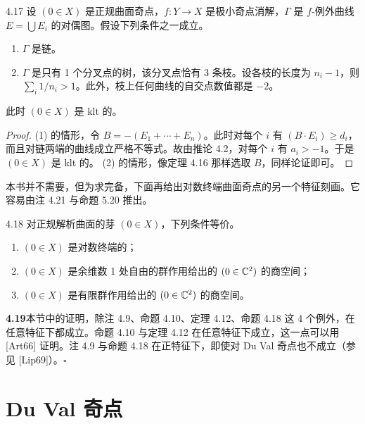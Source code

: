 \begin{theoremp}{4.17}
设 $(0\in X)$ 是正规曲面奇点，$f\colon Y\to X$ 是极小奇点消解，$\Gamma$ 是 $f$-例外曲线 $E=\bigcup E_i$ 的对偶图。假设下列条件之一成立。
\begin{enumerate}[label=(\arabic*),leftmargin=*]
\item $\Gamma$ 是链。
\item $\Gamma$ 是只有 1 个分叉点的树，该分叉点恰有 3 条枝。设各枝的长度为 $n_i-1$，则 $\sum_i1/n_i>1$。此外，枝上任何曲线的自交点数值都是 $-2$。
\end{enumerate}
此时 $(0\in X)$ 是 klt 的。
\end{theoremp}

\begin{proof}
(1) 的情形，令 $B=-(E_1+\cdots+E_n)$。此时对每个 $i$ 有 $(B\cdot E_i)\ge d_i$，而且对链两端的曲线成立严格不等式。故由推论 4.2，对每个 $i$ 有 $a_i>-1$。于是 $(0\in X)$ 是 klt 的。
(2) 的情形，像定理 4.16 那样选取 $B$，同样论证即可。
\end{proof}

本书并不需要，但为求完备，下面再给出对数终端曲面奇点的另一个特征刻画。它容易由注 4.21 与命题 5.20 推出。

\begin{proposition}{4.18}
对正规解析曲面的芽 $(0\in X)$，下列条件等价。
\begin{enumerate}[label=(\arabic*),leftmargin=*]
\item $(0\in X)$ 是对数终端的；
\item $(0\in X)$ 是余维数 1 处自由的群作用给出的 $(0\in\mathbb{C}^2)$ 的商空间；
\item $(0\in X)$ 是有限群作用给出的 $(0\in\mathbb{C}^2)$ 的商空间。
\end{enumerate}
\end{proposition}

\par\medskip\noindent\textbf{4.19}\quad 本节中的证明，除注 4.9、命题 4.10、定理 4.12、命题 4.18 这 4 个例外，在任意特征下都成立。命题 4.10 与定理 4.12 在任意特征下成立，这一点可以用 [Art66] 证明。注 4.9 与命题 4.18 在正特征下，即使对 Du Val 奇点也不成立（参见 [Lip69]）。\hfill$\square$


\section{Du Val 奇点}

